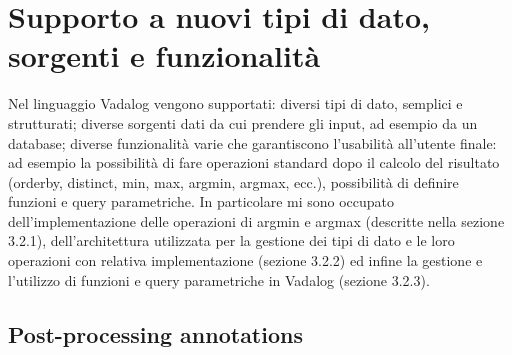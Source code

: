 \section{Supporto a nuovi tipi di dato, sorgenti e funzionalità}

Nel linguaggio Vadalog vengono supportati: diversi tipi di dato, semplici e strutturati; diverse sorgenti dati da cui prendere gli input, ad esempio da un database; diverse funzionalità varie che garantiscono l'usabilità all'utente finale: ad esempio la possibilità di fare operazioni standard dopo il calcolo del risultato (orderby, distinct, min, max, argmin, argmax, ecc.), possibilità di definire funzioni e query parametriche. \newline
In particolare mi sono occupato dell'implementazione delle operazioni di argmin e argmax (descritte nella sezione 3.2.1), dell'architettura utilizzata per la gestione dei tipi di dato e le loro operazioni con relativa implementazione (sezione 3.2.2) ed infine la gestione e l'utilizzo di funzioni e query parametriche in Vadalog (sezione 3.2.3).

\subsection{Post-processing annotations}

